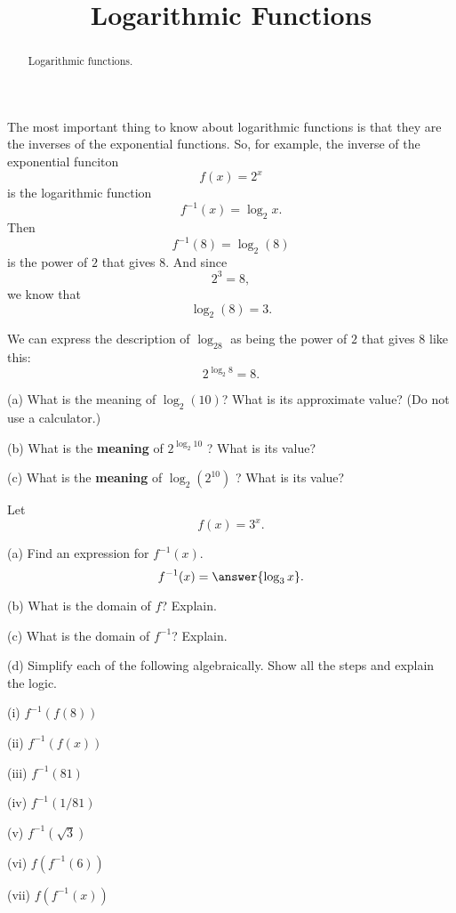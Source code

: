 \documentclass{ximera}
\title{Logarithmic Functions}
\begin{document}
\begin{abstract}
Logarithmic functions.
\end{abstract}
\maketitle


The most important thing to know about logarithmic functions is that they are the inverses of the exponential functions. So, for example, the inverse of the exponential funciton
\[
    f(x) = 2^x
\]
is the logarithmic function 
\[
   f^{-1}(x) = \log_2 x.
\]
Then 
\[
    f^{-1}(8) = \log_2 (8)    
\]
is the power of $2$ that gives $8$. And since
\[
   2^3 = 8 ,
\]
we know that
\[
   \log_2(8) = 3 .
\]

We can express the description of $\log_28$ as being the power of $2$ that gives $8$ like this:
\[
   2^{\log_2 8} = 8.
\]

\begin{question}    \label{Ex0:LogF}
(a) What is the meaning of $\log_2(10)$? What is its approximate value? (Do not use a calculator.)

(b) What is the {\bf meaning} of $2^{\log_2 10}$ ? What is its value?

(c) What is the {\bf meaning} of $\log_2 (2^{10})$ ? What is its value?

\end{question}


\begin{question}  \label{Q1:LogF}
Let 
\[
    f(x) = 3^x .
\]

(a) Find an expression for $f^{-1}(x)$.
\[
   f^{-1}(x) = \answer{\log_3 x}.
\]

(b) What is the domain of $f$? Explain.

(c) What is the domain of $f^{-1}$? Explain.

(d) Simplify each of the following algebraically. Show all the steps and explain the logic.

(i) $f^{-1}(f(8))$

(ii)  $f^{-1}(f(x))$

(iii) $f^{-1}(81)$

(iv) $f^{-1}(1/81)$

(v) $f^{-1} (\sqrt{3})$

(vi) $f(f^{-1}(6))$

(vii) $f(f^{-1}(x))$


\end{question}
\end{document}
